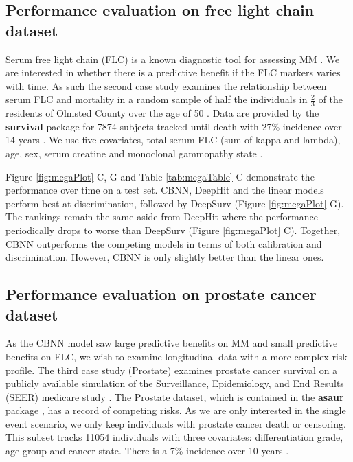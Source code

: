\documentclass[preprint,12pt]{elsarticle}
\begin{document}

\hypertarget{pe-flc}{%
\subsection{Performance evaluation on free light chain dataset}\label{pe-flc}}
Serum free light chain (FLC) is a known diagnostic tool for assessing MM \citep{mm2flc}. We are interested in whether there is a predictive benefit if the FLC markers
varies with time. As such the second case study examines the relationship between serum FLC and mortality in a random sample of half the individuals in
$\frac{2}{3}$ of the residents of Olmsted County over the age of 50 \citep{flc}. Data are provided by the \textbf{survival} package \citep{survpkg} for 7874 subjects tracked
until death with 27\% incidence over 14 years \citep{flc}. We use five covariates, total serum FLC (sum of kappa and lambda), age, sex, serum creatine and monoclonal gammopathy state \citep{flc}.

Figure \ref{fig:megaPlot} C, G and Table \ref{tab:megaTable} C demonstrate the performance over time on a test set. CBNN, DeepHit and the linear models perform best at
discrimination, followed by DeepSurv (Figure \ref{fig:megaPlot} G). The rankings remain the same aside from DeepHit where the performance periodically drops to worse
than DeepSurv (Figure \ref{fig:megaPlot} C). Together, CBNN outperforms the competing models in terms of both calibration and discrimination.
However, CBNN is only slightly better than the linear ones.

\hypertarget{pe-prostate}{%
\subsection{Performance evaluation on prostate cancer dataset}\label{pe-prostate}}
As the CBNN model saw large predictive benefits on MM and small predictive benefits on FLC, we wish to examine longitudinal data with a more complex risk profile.
The third case study (Prostate) examines prostate cancer survival on a publicly available simulation of the Surveillance, Epidemiology, and End Results (SEER) medicare study \citep{prostate}.
The Prostate dataset, which is contained in the \textbf{asaur} package \citep{asaur}, has a record of competing risks. As we are only interested in the single event scenario,
we only keep individuals with prostate cancer death or censoring. This subset tracks 11054 individuals with three covariates: differentiation grade, age group and cancer
state. There is a 7\% incidence over 10 years \citep{prostate}.
\end{document}
